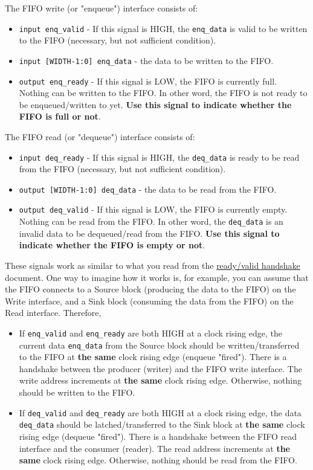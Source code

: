 \documentclass[11pt]{article}
\begin{document}
The FIFO write (or "enqueue") interface consists of:
\begin{itemize}
    \item \verb|input enq_valid| - If this signal is HIGH, the \verb|enq_data| is valid to be written to the FIFO (necessary, but not sufficient condition).
    \item \verb|input [WIDTH-1:0] enq_data| - the data to be written to the FIFO.
    \item \verb|output enq_ready| - If this signal is LOW, the FIFO is currently full. Nothing can be written to the FIFO. In other word, the FIFO is not ready to be enqueued/written to yet. \textbf{Use this signal to indicate whether the FIFO is full or not}.
\end{itemize}

The FIFO read (or "dequeue") interface consists of:
\begin{itemize}
    \item \verb|input deq_ready| - If this signal is HIGH, the \verb|deq_data| is ready to be read from the FIFO (necessary, but not sufficient condition).
    \item \verb|output [WIDTH-1:0] deq_data| - the data to be read from the FIFO.
    \item \verb|output deq_valid| - If this signal is LOW, the FIFO is currently empty. Nothing can be read from the FIFO. In other word, the \verb|deq_data| is an invalid data to be dequeued/read from the FIFO. \textbf{Use this signal to indicate whether the FIFO is empty or not}.
\end{itemize}

These signals work as similar to what you read from the \href{http://inst.eecs.berkeley.edu/~eecs151/sp20/files/verilog/ready_valid_interface.pdf}{ready/valid handshake} document. One way to imagine how it works is, for example, you can assume that the FIFO connects to a Source block (producing the data to the FIFO) on the Write interface, and a Sink block (consuming the data from the FIFO) on the Read interface. Therefore,

\begin{itemize}
    \item If \verb|enq_valid| and \verb|enq_ready| are both HIGH at a clock rising edge, the current data \verb|enq_data| from the Source block should be written/transferred to the FIFO at \textbf{the same} clock rising edge (enqueue "fired"). There is a handshake between the producer (writer) and the FIFO write interface. The write address increments at \textbf{the same} clock rising edge. Otherwise, nothing should be written to the FIFO.
    \item If \verb|deq_valid| and \verb|deq_ready| are both HIGH at a clock rising edge, the data \verb|deq_data| should be latched/transferred to the Sink block at \textbf{the same} clock rising edge (dequeue "fired"). There is a handshake between the FIFO read interface and the consumer (reader). The read address increments at \textbf{the same} clock rising edge. Otherwise, nothing should be read from the FIFO.
\end{itemize}
\end{document}
